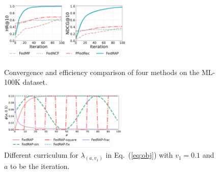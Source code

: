 \documentclass{article} %
\newcommand{\customeqref}[1]{({\ref{#1}})}
\begin{document}
\begin{figure}[!htbp]
    \centering
  \begin{minipage}[t]{0.48\linewidth}
    \centering
    \includegraphics[height=7.5em]{MovieLens-100k.pdf}
    \caption{Convergence and efficiency comparison of four methods on the ML-100K dataset.}
    \label{fig:convergence}
  \end{minipage}%
    \hfill
  \begin{minipage}[t]{0.48\linewidth}
    \centering
    \includegraphics[height=7.5em]{ablation_params_types.pdf}
    \caption{Different curriculum for $\lambda_(a,v_1)$ in Eq.~\customeqref{eq:obj} with $v_1=0.1$ and $a$ to be the iteration.}
    \label{fig:curriculum_types}
  \end{minipage}%
\end{figure}
\end{document}

